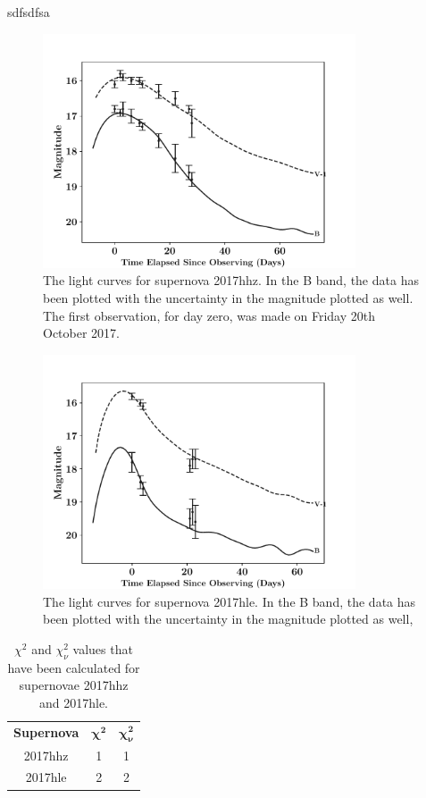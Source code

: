 \documentclass[twocolumn]{revtex4}
\begin{document}
sdfsdfsa

\begin{figure}[!h]
\begin{center}
\includegraphics[width=9.25cm]{results/2017hhz}
\caption[]{The light curves for supernova 2017hhz. In the B band, the data has been plotted with the uncertainty in the magnitude plotted as well. The first observation, for day zero, was made on Friday 20th October 2017.}
\label{2017hhz-data}
\end{center}
\end{figure}

\begin{figure}[!h]
\begin{center}
\includegraphics[width=9.25cm]{results/2017hle}
\caption[]{The light curves for supernova 2017hle. In the B band, the data has been plotted with the uncertainty in the magnitude plotted as well, }
\label{2017hle-data}
\end{center}
\end{figure}

\begin{table}[h!]
\centering
\begin{tabular}{c@{\hskip 20pt}c@{\hskip 20pt}c} 
 \hline
 \textbf{Supernova} & \textbf{$\boldsymbol{\chi^2}$} & \textbf{$\boldsymbol{\chi^2_{\nu}}$} \\ [0.5ex] 
 2017hhz & 1 & 1 \\
 2017hle & 2 & 2 \\
 \hline
\end{tabular}
\caption{$\chi^2$ and $\chi^2_{\nu}$ values that have been calculated for supernovae 2017hhz and 2017hle.}
\label{chi2-table}
\end{table}
\end{document}
